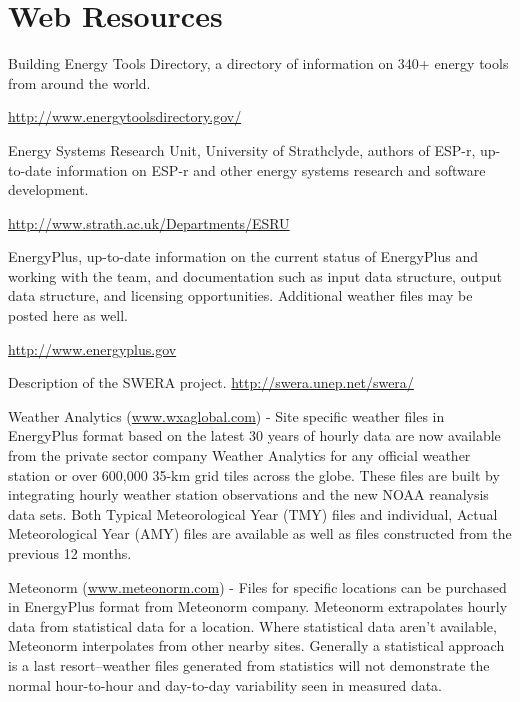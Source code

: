 \section{Web Resources}\label{web-resources}

Building Energy Tools Directory, a directory of information on 340+ energy tools from around the world.

\url{http://www.energytoolsdirectory.gov/}

Energy Systems Research Unit, University of Strathclyde, authors of ESP-r, up-to-date information on ESP-r and other energy systems research and software development.

\url{http://www.strath.ac.uk/Departments/ESRU}

EnergyPlus, up-to-date information on the current status of EnergyPlus and working with the team, and documentation such as input data structure, output data structure, and licensing opportunities. Additional weather files may be posted here as well.

\url{http://www.energyplus.gov}

Description of the SWERA project. \url{http://swera.unep.net/swera/}

Weather Analytics (\href{http://www.wxaglobal.com}{www.wxaglobal.com}) - Site specific weather files in EnergyPlus format based on the latest 30 years of hourly data are now available from the private sector company Weather Analytics for any official weather station or over 600,000 35-km grid tiles across the globe. These files are built by integrating hourly weather station observations and the new NOAA reanalysis data sets. Both Typical Meteorological Year (TMY) files and individual, Actual Meteorological Year (AMY) files are available as well as files constructed from the previous 12 months.

Meteonorm (\href{http://www.meteonorm.com}{www.meteonorm.com}) - Files for specific locations can be purchased in EnergyPlus format from Meteonorm company. Meteonorm extrapolates hourly data from statistical data for a location. Where statistical data aren't available, Meteonorm interpolates from other nearby sites. Generally a statistical approach is a last resort--weather files generated from statistics will not demonstrate the normal hour-to-hour and day-to-day variability seen in measured data.
